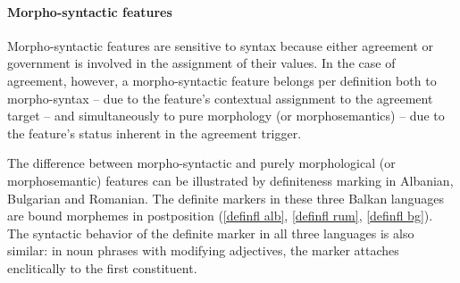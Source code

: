\paragraph*{Morpho-syntactic features} 
Morpho-syntactic features are sensitive to syntax because either agreement or government is involved in the assignment of their values. In the case of agreement, however, a morpho-syntactic feature belongs per definition both to morpho-syntax – due to the feature's contextual assignment to the agreement target – and simultaneously to pure morphology (or morphosemantics) – due to the feature's status inherent in the agreement trigger.

The difference between morpho-syntactic and purely morphological (or morphosemantic) features can be illustrated by definiteness marking in Albanian, Bulgarian and Romanian. The definite markers in these three Balkan languages are bound morphemes in postposition (\ref{definfl alb}, \ref{definfl rum}, \ref{definfl bg}). The syntactic behavior of the definite marker in all three languages is also similar: in noun phrases with modifying adjectives, the marker attaches enclitically to the first constituent. 
